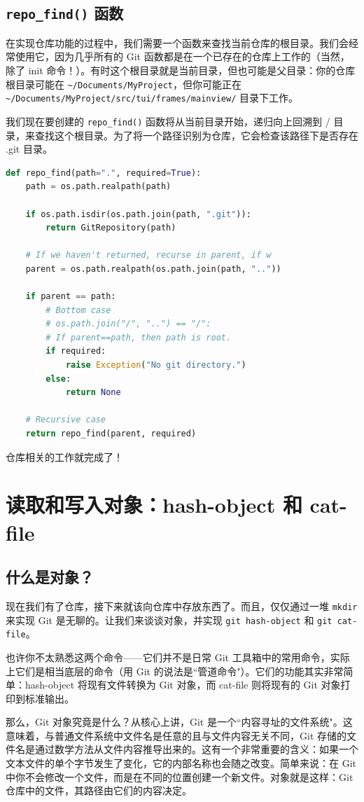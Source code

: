 \documentclass{ctexart}
\theoremstyle{remark}
\theoremstyle{warningstyle}
\theoremstyle{warningstyle}
\begin{document}
\cprotect\subsection{\verb|repo_find()| 函数}
在实现仓库功能的过程中，我们需要一个函数来查找当前仓库的根目录。我们会经常使用它，因为几乎所有的 Git 函数都是在一个已存在的仓库上工作的（当然，除了 init 命令！）。有时这个根目录就是当前目录，但也可能是父目录：你的仓库根目录可能在 \lstinline|~/Documents/MyProject|，但你可能正在 \lstinline|~/Documents/MyProject/src/tui/frames/mainview/| 目录下工作。

我们现在要创建的 \lstinline|repo_find()| 函数将从当前目录开始，递归向上回溯到 / 目录，来查找这个根目录。为了将一个路径识别为仓库，它会检查该路径下是否存在 .git 目录。
\begin{lstlisting}[language=Python]
def repo_find(path=".", required=True):
    path = os.path.realpath(path)

    if os.path.isdir(os.path.join(path, ".git")):
        return GitRepository(path)

    # If we haven't returned, recurse in parent, if w
    parent = os.path.realpath(os.path.join(path, ".."))

    if parent == path:
        # Bottom case
        # os.path.join("/", "..") == "/":
        # If parent==path, then path is root.
        if required:
            raise Exception("No git directory.")
        else:
            return None

    # Recursive case
    return repo_find(parent, required)
\end{lstlisting}
仓库相关的工作就完成了！

\section{读取和写入对象：hash-object 和 cat-file}
\subsection{什么是对象？}
现在我们有了仓库，接下来就该向仓库中存放东西了。而且，仅仅通过一堆 \texttt{mkdir} 来实现 Git 是无聊的。让我们来谈谈对象，并实现 \texttt{git hash-object} 和 \texttt{git cat-file}。

也许你不太熟悉这两个命令——它们并不是日常 Git 工具箱中的常用命令，实际上它们是相当底层的命令（用 Git 的说法是``管道命令"）。它们的功能其实非常简单：hash-object 将现有文件转换为 Git 对象，而 cat-file 则将现有的 Git 对象打印到标准输出。

那么，Git 对象究竟是什么？从核心上讲，Git 是一个``内容寻址的文件系统"。这意味着，与普通文件系统中文件名是任意的且与文件内容无关不同，Git 存储的文件名是通过数学方法从文件内容推导出来的。这有一个非常重要的含义：如果一个文本文件的单个字节发生了变化，它的内部名称也会随之改变。简单来说：在 Git 中你不会修改一个文件，而是在不同的位置创建一个新文件。对象就是这样：Git 仓库中的文件，其路径由它们的内容决定。
\end{document}
